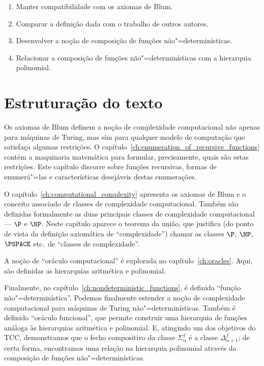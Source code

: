 \begin{enumerate}
    \item Manter compatibilidade com os axiomas de Blum.
    \item Comparar a definição dada com o trabalho de outros autores.
    \item Desenvolver a noção de composição de funções não"=determinísticas.
    \item Relacionar a composição de funções não"=determinísticas
        com a hierarquia polinomial.
\end{enumerate}

\section{Estruturação do texto}

Os axiomas de Blum definem a noção de complexidade computacional
não apenas para máquinas de Turing,
mas sim para qualquer modelo de computação que satisfaça algumas restrições.
O capítulo~\ref{ch:enumeration_of_recursive_functions}
contém a maquinaria matemática para formular,
precisamente,
quais são estas restrições.
Este capítulo discorre sobre funções recursivas,
formas de enumerá"=las
e características desejáveis destas enumerações.

O capítulo~\ref{ch:computational_complexity}
apresenta os axiomas de Blum
e o conceito associado de classes de complexidade computacional.
Também são definidas formalmente
as duas principais classes de complexidade computacional
--- $\P$ e $\NP$.
Neste capítulo aparece o teorema da união,
que justifica
(do ponto de vista da definição axiomática de ``complexidade'')
chamar as classes $\P$, $\NP$, $\PSPACE$ etc.\ de ``classes de complexidade''.

A noção de ``oráculo computacional'' é explorada no capítulo~\ref{ch:oracles}.
Aqui,
são definidas as hierarquias aritmética e polinomial.

Finalmente,
no capítulo~\ref{ch:nondeterministic_functions},
é definida ``função não"=determinística''.
Podemos finalmente estender a noção de complexidade computacional
para máquinas de Turing não"=determinísticas.
Também é definido ``oráculo funcional'',
que permite construir uma hierarquia de funções
análoga às hierarquias aritmética e polinomial.
E, atingindo um dos objetivos do TCC,
demonstramos que o fecho compositivo da classe $\Sigma_n^f$
é a classe $\Delta_{n+1}^f$;
de certa forma,
encontramos uma relação na hierarquia polinomial
através da composição de funções não"=determinísticas.
